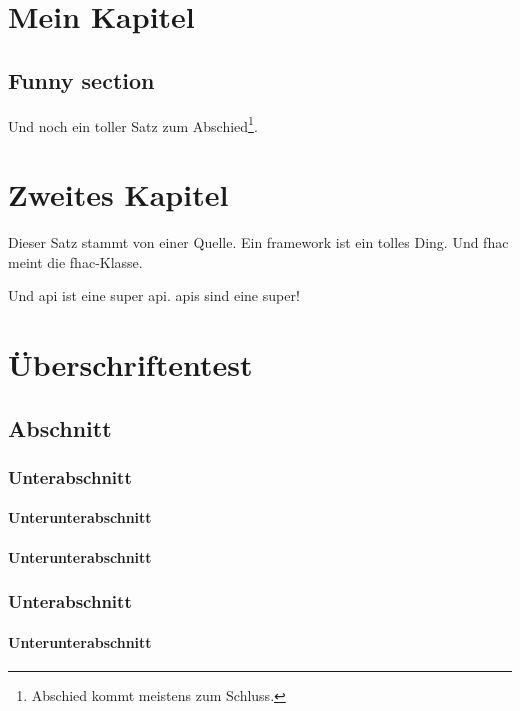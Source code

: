 \blinddocument

\chapter{Mein Kapitel}\label{ch:example1}
\section{Funny section}\label{sec:funny}
\Blindtext[5][3]

Und noch ein toller Satz zum Abschied\footnote{Abschied kommt meistens zum Schluss.}.

\Blindtext

\chapter{Zweites Kapitel}\label{ch:example2}
Dieser Satz stammt von einer Quelle.\cite{github}
Ein \Gls{framework} ist ein tolles Ding.
Und \gls{fhac} meint die \gls{fhac}-Klasse.

Und \Gls{api} ist eine super \Gls{api}.
\glspl{api} sind eine super!

\chapter{Überschriftentest}\label{ch:example3}
\section{Abschnitt}\label{sec:example3}
\subsection{Unterabschnitt}\label{subsec:example3-1}
\subsubsection{Unterunterabschnitt}\label{subsubsec:example3-1-1}
\subsubsection{Unterunterabschnitt}\label{subsubsec:example3-1-2}
\subsection{Unterabschnitt}\label{subsec:example3-2}
\subsubsection{Unterunterabschnitt}\label{subsubsec:example3-2-1}
